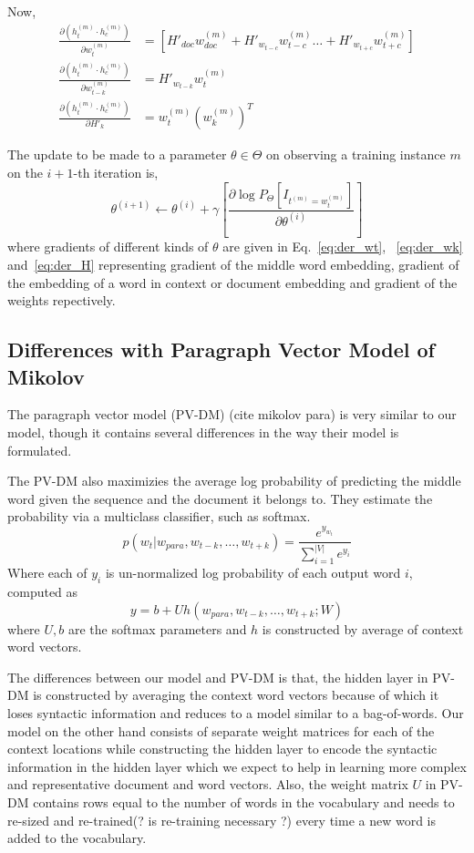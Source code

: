 \documentclass{article}
\begin{document}
Now,
\begin{align}
\label{eq:der_wt}
\frac{\partial (h^{(m)}_{t}\cdot h^{(m)}_{c})}{\partial w^{(m)}_{t}} &= \left[ H'_{doc}w^{(m)}_{doc} + H'_{w_{t-c}}w^{(m)}_{t-c} \ldots +  H'_{w_{t+c}}w^{(m)}_{t+c} \right] \\
\label{eq:der_wk}
\frac{\partial (h^{(m)}_{t}\cdot h^{(m)}_{c})}{\partial w^{(m)}_{t-k}} &= H'_{w_{t-k}}w^{(m)}_{t} \\
\label{eq:der_H}
\frac{\partial (h^{(m)}_{t}\cdot h^{(m)}_{c})}{\partial H'_{k}} &= w^{(m)}_{t} (w^{(m)}_{k})^{T}
\end{align}

The update to be made to a parameter $\theta \in \Theta$ on observing a training instance $m$ on the $i+1$-th iteration is,
\begin{equation}
\label{eq:update}
\theta^{(i+1)} \leftarrow \theta^{(i)} + \gamma \left[\frac{\partial \log P_{\Theta}\left[I_{t^{(m)}=w^{(m)}_{t}} \right]}{\partial \theta^{(i)}} \right]
\end{equation} 
where gradients of different kinds of $\theta$ are given in Eq.~\ref{eq:der_wt}, ~\ref{eq:der_wk} and~\ref{eq:der_H} representing gradient of the middle word embedding, gradient of the embedding of a word in context or document embedding and gradient of the weights repectively.

\subsection{Differences with Paragraph Vector Model of Mikolov}
The paragraph vector model (PV-DM) (cite mikolov para) is very similar to our model, though it contains several differences in the way their model is formulated. 

The PV-DM also maximizies the average log probability of predicting the middle word given the sequence and the document it belongs to. They estimate the probability via a multiclass classifier, such as softmax.
\begin{equation}
p(w_{t} | w_{para}, w_{t-k}, \ldots, w_{t+k}) = \frac{e^{y_{w_{t}}}}{\sum_{i=1}^{|V|} e^{y_{i}}}
\end{equation}
Where each of $y_{i}$ is un-normalized log probability of each output word $i$, computed as 
\begin{equation}
y = b + Uh(w_{para}, w_{t-k}, \ldots, w_{t+k}; W)
\end{equation}
where $U,b$ are the softmax parameters and $h$ is constructed by average of context word vectors.

The differences between our model and PV-DM is that, the hidden layer in PV-DM is constructed by averaging the context word vectors because of which it loses syntactic information and reduces to a model similar to a bag-of-words. Our model on the other hand consists of separate weight matrices for each of the context locations while constructing the hidden layer to encode the syntactic information in the hidden layer which we expect to help in learning more complex and representative document and word vectors. 
Also, the weight matrix $U$ in PV-DM contains rows equal to the number of words in the vocabulary and needs to re-sized and re-trained(? is re-training necessary ?) every time a new word is added to the vocabulary.
\end{document}
